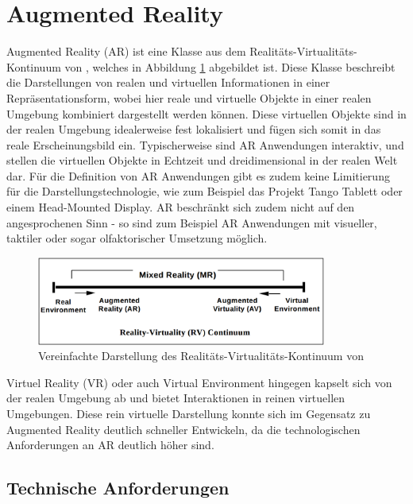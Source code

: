
\section{Augmented Reality}

Augmented Reality (AR) ist eine Klasse aus dem Realitäts-Virtualitäts-Kontinuum von \cite{milgram1995augmented}, welches in Abbildung \ref{fig:virtual-continuum} abgebildet ist. Diese Klasse beschreibt die Darstellungen von realen und virtuellen Informationen in einer Repräsentationsform, wobei hier reale und virtuelle Objekte in einer realen Umgebung kombiniert dargestellt werden können. Diese virtuellen Objekte sind in der realen Umgebung idealerweise fest lokalisiert und fügen sich somit in das reale Erscheinungsbild ein. Typischerweise sind AR Anwendungen interaktiv, und stellen die virtuellen Objekte in Echtzeit und dreidimensional in der realen Welt dar. Für die Definition von AR Anwendungen gibt es zudem keine Limitierung für die Darstellungstechnologie, wie zum Beispiel das Projekt Tango Tablett oder einem Head-Mounted Display. AR beschränkt sich zudem nicht auf den angesprochenen Sinn - so sind zum Beispiel AR Anwendungen mit visueller, taktiler oder sogar olfaktorischer Umsetzung möglich.\\

\begin{figure}
  \centering
	\includegraphics[width=0.85\textwidth]{content/images/theory/virtual-continuum.png} 
  \caption{Vereinfachte Darstellung des Realitäts-Virtualitäts-Kontinuum von \citet*{milgram1995augmented}}
  \label{fig:virtual-continuum}
\end{figure}


Virtuel Reality (VR) oder auch Virtual Environment hingegen kapselt sich von der realen Umgebung ab und bietet Interaktionen in reinen virtuellen Umgebungen. Diese rein virtuelle Darstellung konnte sich im Gegensatz zu Augmented Reality deutlich schneller Entwickeln, da die technologischen Anforderungen an AR deutlich höher sind. \citep{van2010survey}\\

\subsection{Technische Anforderungen}

